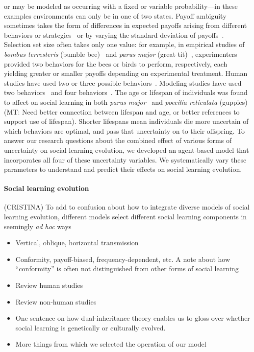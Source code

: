 \documentclass[letterpaper,11.5pt]{scrartcl}
\newcommand{\mt}[1]{{\textcolor{myorange} {({\tiny MT:} #1)}}}
\begin{document}
or may be
modeled as occurring with a fixed or variable
probability---in these examples environments
can only be in one of two states. Payoff ambiguity sometimes takes the form
of differences in expected payoffs arising from different
behaviors or strategies~\cite{Enquist2007,Rendell2010}
or by varying the standard deviation of payoffs~\cite{McElreath2005}. 
Selection set size often takes only one value: 
for example, in empirical studies of \emph{bombus terresteris} (bumble
bee)~\cite{Baracchi2018} and \emph{parus major} (great tit)~\cite{Aplin2017},
experimenters provided two behaviors for
the bees or birds to perform, respectively, each yielding greater or smaller
payoffs depending on experimental treatment. Human studies have used two
or three possible behaviors~\cite{McElreath2005,Toyokawa2019}.
Modeling studies have used two 
behaviors~\cite{Feldman1996,Rendell2010} and four behaviors~\cite{Enquist2007}. 
The age or lifespan of individuals was
found to affect on social learning in both \emph{parus
major}~\cite{Aplin2017} and \emph{poecilia reticulata} 
(guppies)~\cite{Leris2016} \mt{Need better connection between lifespan and 
age, or better references to support use of lifespan}.
Shorter lifespans mean individuals
die more uncertain of which behaviors are optimal, and pass that uncertainty on
to their offspring. To answer our research questions about the combined effect
of various forms of uncertainty on social learning evolution, we developed an
agent-based model that incorporates all four of
these uncertainty variables. We systematically vary these parameters
to understand and predict their effects on social learning evolution.

\paragraph{Social learning evolution} (CRISTINA)
To add to confusion about how to integrate diverse models of social learning
evolution, different models select different social learning components in
seemingly \emph{ad hoc} ways 
\begin{itemize}
  \item 
    Vertical, oblique, horizontal transmission
  \item
    Conformity, payoff-biased, frequency-dependent, etc. A note about how
    ``conformity'' is often not distinguished from other forms of social learning
  \item
    Review human studies
  \item
    Review non-human studies~\cite{Leris2016,Aplin2017,Avargues-Weber2018,Baracchi2018}
  \item
    One sentence on how dual-inheritance theory enables us to gloss over whether
    social learning is genetically or culturally evolved.
  \item
    More things from which we selected the operation of our model
\end{itemize}
\end{document}
